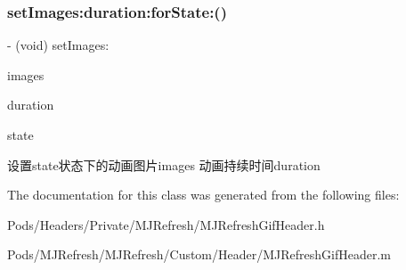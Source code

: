 \subsubsection{\texorpdfstring{set\+Images\+:duration\+:for\+State\+:()}{setImages:duration:forState:()}\hspace{0.1cm}{\footnotesize\ttfamily [3/3]}}
{\footnotesize\ttfamily -\/ (void) set\+Images\+: \begin{DoxyParamCaption}\item[{(N\+S\+Array $\ast$)}]{images }\item[{duration:(N\+S\+Time\+Interval)}]{duration }\item[{forState:(M\+J\+Refresh\+State)}]{state }\end{DoxyParamCaption}}

设置state状态下的动画图片images 动画持续时间duration 

The documentation for this class was generated from the following files\+:\begin{DoxyCompactItemize}
\item 
Pods/\+Headers/\+Private/\+M\+J\+Refresh/M\+J\+Refresh\+Gif\+Header.\+h\item 
Pods/\+M\+J\+Refresh/\+M\+J\+Refresh/\+Custom/\+Header/M\+J\+Refresh\+Gif\+Header.\+m\end{DoxyCompactItemize}
